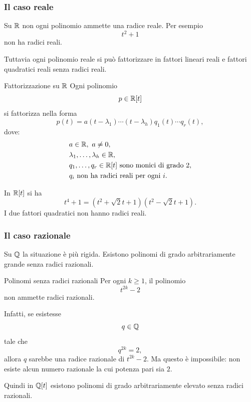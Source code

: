 \documentclass[a4paper]{article}
\begin{document}
\subsubsection{Il caso reale}

Su \(\mathbb{R}\) non ogni polinomio ammette una radice reale. Per esempio
\[
    t^2+1
\]
non ha radici reali.

Tuttavia ogni polinomio reale si può fattorizzare in fattori lineari reali e fattori quadratici reali senza radici reali.

\begin{snippetproposition}{Fattorizzazione su \(\mathbb{R}\)}
    Ogni polinomio
    \[
        p\in\mathbb{R}[t]
    \]
    si fattorizza nella forma
    \[
        p(t)
        =
        a(t-\lambda_1)\cdots(t-\lambda_h)q_1(t)\cdots q_r(t),
    \]
    dove:
    \[
        \begin{array}{ll}
            a\in\mathbb{R},\ a\neq 0,\\[1mm]
            \lambda_1,\ldots,\lambda_h\in\mathbb{R},\\[1mm]
            q_1,\ldots,q_r\in\mathbb{R}[t] \text{ sono monici di grado } 2,\\[1mm]
            q_i \text{ non ha radici reali per ogni } i.
        \end{array}
    \]
\end{snippetproposition}

\begin{snippetexample}{}
    In \(\mathbb{R}[t]\) si ha
    \[
        t^4+1
        =
        (t^2+\sqrt{2}t+1)(t^2-\sqrt{2}t+1).
    \]
    I due fattori quadratici non hanno radici reali.
\end{snippetexample}

\subsubsection{Il caso razionale}

Su \(\mathbb{Q}\) la situazione è più rigida. Esistono polinomi di grado arbitrariamente grande senza radici razionali.

\begin{snippetexample}{Polinomi senza radici razionali}
    Per ogni \(k\geq 1\), il polinomio
    \[
        t^{2k}-2
    \]
    non ammette radici razionali.

    Infatti, se esistesse
    \[
        q\in\mathbb{Q}
    \]
    tale che
    \[
        q^{2k}=2,
    \]
    allora \(q\) sarebbe una radice razionale di \(t^{2k}-2\). Ma questo è impossibile: non esiste alcun numero razionale la cui potenza pari sia \(2\).

    Quindi in \(\mathbb{Q}[t]\) esistono polinomi di grado arbitrariamente elevato senza radici razionali.
\end{snippetexample}
\end{document}
